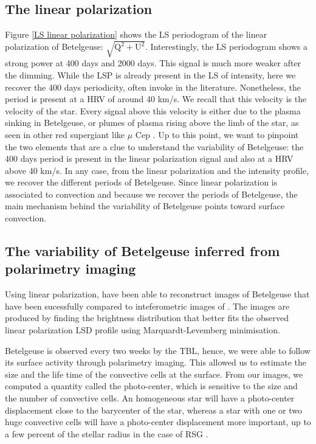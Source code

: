 \documentclass{aa}
\begin{document}
\subsection{The linear polarization}

Figure \ref{LS linear polarization} shows the LS periodogram of the linear polarization of Betelgeuse: $\sqrt{\mathrm{Q^2+U^2}}$. 
Interestingly, the LS periodogram shows a strong power at 400 days and 2000 days. This signal is much more weaker after the dimming.
While the LSP is already present in the LS of intensity, here we recover the 400 days periodicity, often invoke in the literature. 
Nonetheless, the period is present at a HRV of around 40 km/s. We recall that this velocity is the velocity of the star. 
Every signal above this velocity is either due to the plasma sinking in Betelgeuse, or plumes of plasma rising above the limb of the star, 
as seen in other red supergiant like $\mu$ Cep \citep{lopez_ariste_height_2023}. Up to this point, we want to pinpoint the two elements that are a clue 
to understand the variability of Betelgeuse: the 400 days period is present in the linear polarization signal and also at a HRV above 40 km/s.
In any case, from the linear polarization and the intensity profile, we recover the different periods of Betelgeuse. Since linear polarization is 
associated to convection and because we recover the periods of Betelgeuse, the main mechanism behind the variability of Betelgeuse points toward surface convection.

\subsection{The variability of Betelgeuse inferred from polarimetry imaging}

Using linear polarization, \cite{lopez_ariste_convective_2018} have been able to reconstruct images of Betelgeuse that have been sucessfully compared 
to inteferometric images of \cite{montarges_close_2016}. The images are produced by finding the brightness distribution that better fits the observed linear 
polarization LSD profile using Marquardt-Levemberg minimisation.

Betelgeuse is observed every two weeks by the TBL, hence,
we were able to follow its surface activity through polarimetry imaging. This allowed us to estimate the size and the life time of the convective cells
at the surface. From our images, we computed a quantity called the photo-center, which is sensitive to the size and the number of convective cells. 
An homogeneous star will have a photo-center displacement close to the barycenter of the star, whereas a star with one or two huge convective cells will have a
photo-center displacement more important, up to a few percent of the stellar radius in the case of RSG \citep{chiavassa_probing_2022}. 
\end{document}
